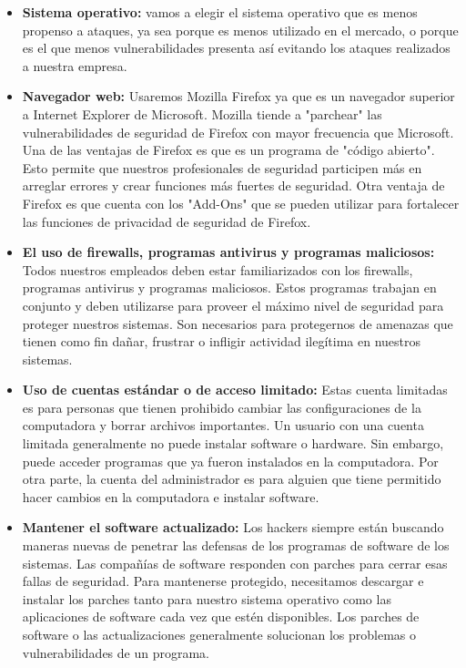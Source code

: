 \documentclass[11pt,bibtotoc,noliststotoc,BCOR0mm]{scrbook}
\begin{document}
\begin{itemize}
\item \textbf{Sistema operativo:} vamos a elegir el sistema operativo que es menos propenso a ataques, ya sea porque es menos utilizado en el mercado, o porque es el que menos vulnerabilidades presenta así evitando los ataques realizados a nuestra empresa.
\item \textbf{Navegador web:} Usaremos Mozilla Firefox ya que es un navegador superior a Internet Explorer de Microsoft. Mozilla tiende a "parchear" las vulnerabilidades de seguridad de Firefox con mayor frecuencia que Microsoft. Una de las ventajas de Firefox es que es un programa de "código abierto". Esto permite que nuestros profesionales de seguridad participen más en arreglar errores y crear funciones más fuertes de seguridad. Otra ventaja de Firefox es que cuenta con los "Add-Ons" que se pueden utilizar para fortalecer las funciones de privacidad de seguridad de Firefox.
\item \textbf{El uso de firewalls, programas antivirus y programas maliciosos:} Todos nuestros empleados deben estar familiarizados con los firewalls, programas antivirus y programas maliciosos. Estos programas trabajan en conjunto y deben utilizarse para proveer el máximo nivel de seguridad para proteger nuestros sistemas. Son necesarios para protegernos de amenazas que tienen como fin dañar, frustrar o infligir actividad ilegítima en nuestros sistemas.
\item \textbf{Uso de cuentas estándar o de acceso limitado:} Estas cuenta limitadas es para personas que tienen prohibido cambiar las configuraciones de la computadora y borrar archivos importantes. Un usuario con una cuenta limitada generalmente no puede instalar software o hardware. Sin embargo, puede acceder programas que ya fueron instalados en la computadora. Por otra parte, la cuenta del administrador es para alguien que tiene permitido hacer cambios en la computadora e instalar software.
\item \textbf{Mantener el software actualizado:} Los hackers siempre están buscando maneras nuevas de penetrar las defensas de los programas de software de los sistemas. Las compañías de software responden con parches para cerrar esas fallas de seguridad. Para mantenerse protegido, necesitamos descargar e instalar los parches tanto para nuestro sistema operativo como las aplicaciones de software cada vez que estén disponibles. Los parches de software o las actualizaciones generalmente solucionan los problemas o vulnerabilidades de un programa.

\end{itemize}
\end{document}
